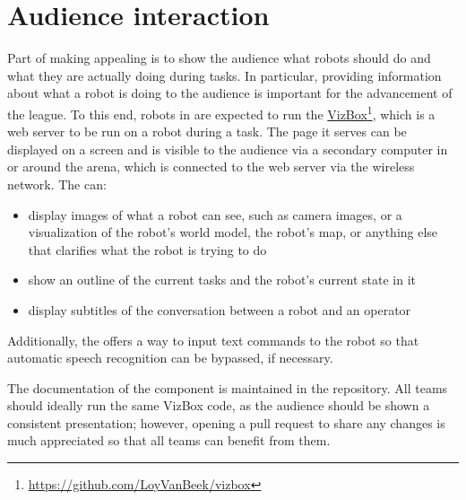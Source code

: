 \section{Audience interaction}
\label{rule:vizbox}

Part of making \RoboCup\AtHome{} appealing is to show the audience what robots should do and what they are actually doing during tasks.
In particular, providing information about what a robot is doing to the audience is important for the advancement of the league.
To this end, robots in \AtHome{} are expected to run the \RoboCup\AtHome{} \href{https://github.com/LoyVanBeek/vizbox}{VizBox}\footnote{\url{https://github.com/LoyVanBeek/vizbox}}, which is a web server to be run on a robot during a task.
The page it serves can be displayed on a screen and is visible to the audience via a secondary computer in or around the arena, which is connected to the web server via the wireless network.
The  can:
\begin{itemize}
	\item display images of what a robot can see, such as camera images, or a visualization of the robot's world model, the robot's map, or anything else that clarifies what the robot is trying to do
	\item show an outline of the current tasks and the robot's current state in it
	\item display subtitles of the conversation between a robot and an operator
\end{itemize}
Additionally, the  offers a way to input text commands to the robot so that automatic speech recognition can be bypassed, if necessary.

The documentation of the component is maintained in the  repository.
All teams should ideally run the same VizBox code, as the audience should be shown a consistent presentation; however, opening a pull request to share any changes is much appreciated so that all teams can benefit from them.
